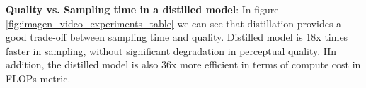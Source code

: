 \textbf{Quality vs. Sampling time in a distilled model}: In figure \ref{fig:imagen_video_experiments_table} we can see that distillation provides a good trade-off between sampling time and quality. Distilled model is 18x times faster in sampling, without significant degradation in perceptual quality. IIn addition, the distilled model is also 36x more efficient in terms of compute cost in FLOPs metric. 

